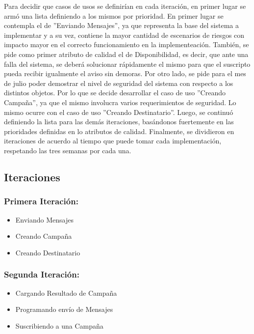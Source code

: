 \documentclass[a4paper, 11pt]{article}
\begin{document}
Para decidir que casos de usos se definirían en cada iteración, en primer lugar se armó una lista definiendo a los mismos por prioridad. En primer lugar se contempla el de ''Enviando Mensajes'', ya que representa la base del sistema a implementar y a su vez, contiene la mayor cantidad de escenarios de riesgos con impacto mayor en el correcto funcionamiento en la implementeación. También, se pide como primer atributo de calidad el de Disponibilidad, es decir, que ante una falla del sistema, se deberá solucionar rápidamente el mismo para que el suscripto pueda recibir igualmente el aviso sin demoras. 
Por otro lado, se pide para el mes de julio poder demostrar el nivel de seguridad del sistema con respecto a los distintos objetos. Por lo que se decide desarrollar el caso de uso ''Creando Campaña'', ya que el mismo involucra varios requerimientos de seguridad. Lo mismo ocurre con el caso de uso ''Creando Destinatario''.
Luego, se continuó definiendo la lista para las demás iteraciones, basándonos fuertemente en las prioridades definidas en lo atributos de calidad. Finalmente, se dividieron en iteraciones de acuerdo al tiempo que puede tomar cada implementación, respetando las tres semanas por cada una. 



\subsection{Iteraciones}
\subsubsection{Primera Iteraci\'on:}
\begin{itemize}
\item Enviando Mensajes
\item Creando Campaña
\item Creando Destinatario
\end{itemize}

\subsubsection{Segunda Iteraci\'on:}
\begin{itemize}
\item Cargando Resultado de Campaña
\item Programando envío de Mensajes
\item Suscribiendo a una Campaña
\end{itemize}
\end{document}
